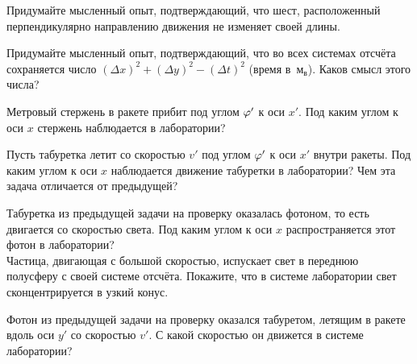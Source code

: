 \documentclass[a4paper,12pt]{article}
\newcommand{\мв}{\,м$_в$}
\begin{document}
\qquad
Придумайте мысленный опыт, подтверждающий, что шест, расположенный перпендикулярно направлению движения не изменяет своей длины.

\qquad
Придумайте мысленный опыт, подтверждающий, что во всех системах отсчёта сохраняется число $(\Delta x)^2 + (\Delta y)^2 - (\Delta t)^2$ (время в \мв). Каков смысл этого числа?

\qquad
Метровый стержень в ракете прибит под углом $\varphi'$ к оси $x'$. Под каким углом  к оси $x$ стержень наблюдается в лаборатории?

\qquad
Пусть табуретка летит со скоростью $v'$ под углом $\varphi'$ к оси $x'$ внутри ракеты. Под каким углом  к оси $x$ наблюдается движение табуретки в лаборатории? Чем эта задача отличается от предыдущей?

\qquad
{}
Табуретка из предыдущей задачи на проверку оказалась фотоном, то есть двигается со скоростью света. Под каким углом к оси $x$ распространяется этот фотон в лаборатории?\\
Частица, двигающая с большой скоростью, испускает свет в переднюю полусферу с своей системе отсчёта. Покажите, что в системе лаборатории свет сконцентрируется в узкий конус.

\qquad
Фотон из предыдущей задачи на проверку оказался табуретом, летящим в ракете вдоль оси $y'$ со скоростью $v'$. С какой скоростью он движется в системе лаборатории?
\end{document}
